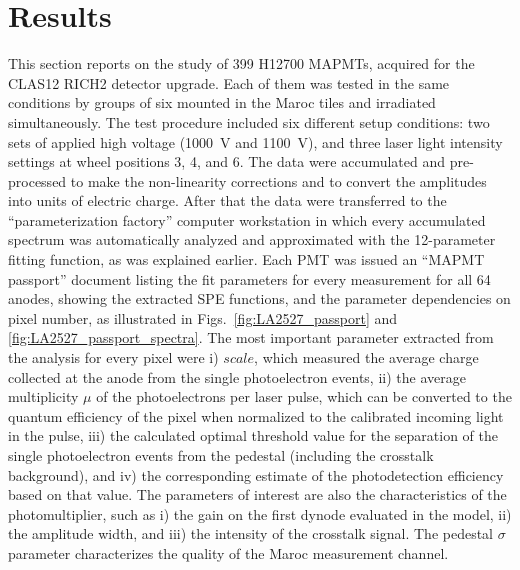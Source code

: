 \section{Results}

This section reports on the study of 399 H12700 MAPMTs, acquired for the CLAS12 RICH2 detector upgrade. Each of them was tested in the same conditions by groups of six mounted in the Maroc tiles and irradiated simultaneously. The test procedure included six different setup conditions: two sets of applied high voltage (1000~V and 1100~V), and three laser light intensity settings at wheel positions 3, 4, and 6. The data were accumulated and pre-processed to make the non-linearity corrections and to convert the amplitudes into units of electric charge. After that the data were transferred to the ``parameterization factory'' computer workstation in which every accumulated spectrum was automatically analyzed and approximated with the 12-parameter fitting function, as was explained earlier. Each PMT was issued an ``MAPMT passport'' document listing the fit parameters for every measurement for all 64 anodes, showing the extracted SPE functions, and the parameter dependencies on pixel number, as illustrated in Figs.~\ref{fig:LA2527_passport} and \ref{fig:LA2527_passport_spectra}. The most important parameter extracted from the analysis for every pixel were i) $scale$, which measured the average charge collected at the anode from the single photoelectron events, ii) the average multiplicity $\mu$ of the photoelectrons per laser pulse, which can be converted to the quantum efficiency of the pixel when normalized to the calibrated incoming light in the pulse, iii) the calculated optimal threshold value for the separation of the single photoelectron events from the pedestal (including the crosstalk background), and iv) the corresponding estimate of the photodetection efficiency based on that value. The parameters of interest are also the characteristics of the photomultiplier, such as i) the gain on the first dynode evaluated in the model, ii) the amplitude width, and iii) the intensity of the crosstalk signal. The pedestal $\sigma$ parameter characterizes the quality of the Maroc measurement channel.

